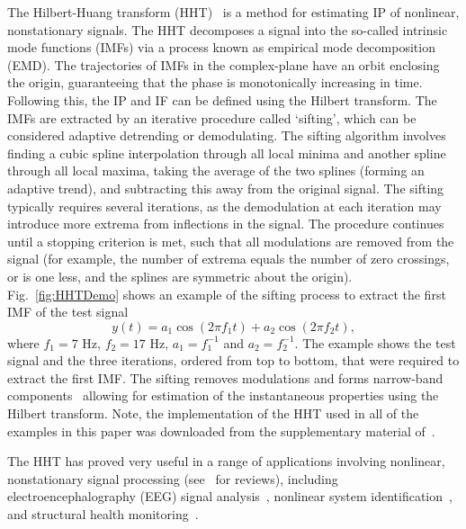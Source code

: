\documentclass[11pt,draftcls,onecolumn]{IEEEtran}
\begin{document}
The Hilbert-Huang transform (HHT)~\cite{Huang1998} is a method for estimating IP of nonlinear, nonstationary signals. The HHT decomposes a signal into the so-called intrinsic mode functions (IMFs) via a process known as empirical mode decomposition (EMD). The trajectories of IMFs in the complex-plane have an orbit enclosing the origin, guaranteeing that the phase is monotonically increasing in time. Following this, the IP and IF can be defined using the Hilbert transform. The IMFs are extracted by an iterative procedure called `sifting', which can be considered adaptive detrending or demodulating. The sifting algorithm involves finding a cubic spline interpolation through all local minima and another spline through all local maxima, taking the average of the two splines (forming an adaptive trend), and subtracting this away from the original signal. The sifting typically requires several iterations, as the demodulation at each iteration may introduce more extrema from inflections in the signal. The procedure continues until a stopping criterion is met, such that all modulations are removed from the signal (for example, the number of extrema equals the number of zero crossings, or is one less, and the splines are symmetric about the origin). Fig.~\ref{fig:HHTDemo} shows an example of the sifting process to extract the first IMF of the test signal
\begin{equation}\label{eq:FirstTestSig}
y\left( t \right) = a_1\cos \left(2\pi f_1t\right) + a_2\cos \left(2\pi f_2t \right),
\end{equation}
where $f_1 = 7$ Hz, $f_2 = 17$ Hz, $a_1 = f_1^{-1}$ and $a_2=f_2^{-1}$. The example shows the test signal and the three iterations, ordered from top to bottom, that were required to extract the first IMF. The sifting removes modulations and forms narrow-band components~\cite{Huang1998} allowing for estimation of the instantaneous properties using the Hilbert transform. Note, the implementation of the HHT used in all of the examples in this paper was downloaded from the supplementary material of~\cite{Wu2009}. 

The HHT has proved very useful in a range of applications involving nonlinear, nonstationary signal processing (see~\cite{Huang2008,Huang2005a} for reviews), including electroencephalography (EEG) signal analysis~\cite{Wang2008}, nonlinear system identification~\cite{Huang2005b}, and structural health monitoring~\cite{Pai2008}.
\end{document}
